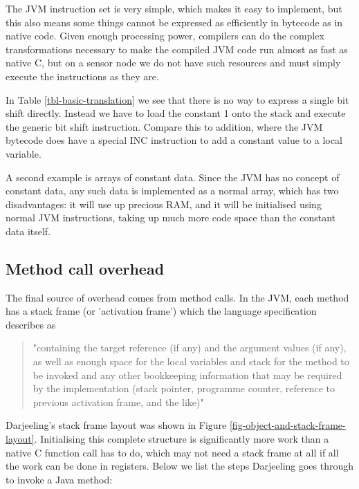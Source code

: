 The JVM instruction set is very simple, which makes it easy to implement, but this also means some things cannot be expressed as efficiently in bytecode as in native code. Given enough processing power, compilers can do the complex transformations necessary to make the compiled JVM code run almost as fast as native C, but on a sensor node we do not have such resources and must simply execute the instructions as they are.

In Table \ref{tbl-basic-translation} we see that there is no way to express a single bit shift directly. Instead we have to load the constant 1 onto the stack and execute the generic bit shift instruction. Compare this to addition, where the JVM bytecode does have a special INC instruction to add a constant value to a local variable.

A second example is arrays of constant data. Since the JVM has no concept of constant data, any such data is implemented as a normal array, which has two disadvantages: it will use up precious RAM, and it will be initialised using normal JVM instructions, taking up much more code space than the constant data itself.

\subsection{Method call overhead}
\label{sec-overhead-method-call}
The final source of overhead comes from method calls. In the JVM, each method has a stack frame (or 'activation frame') which the language specification describes as
\begin{quotation}
"containing the target reference (if any) and the argument values (if any), as well as enough space for the local variables and stack for the method to be invoked and any other bookkeeping information that may be required by the implementation (stack pointer, programme counter, reference to previous activation frame, and the like)" \cite{Gosling:2014}
\end{quotation}

Darjeeling's stack frame layout was shown in Figure \ref{fig-object-and-stack-frame-layout}. Initialising this complete structure is significantly more work than a native C function call has to do, which may not need a stack frame at all if all the work can be done in registers. Below we list the steps Darjeeling goes through to invoke a Java method:

